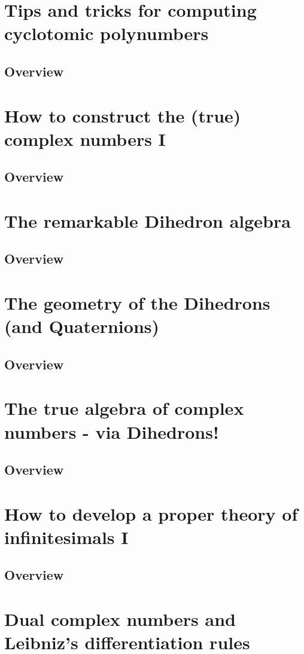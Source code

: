 \documentclass{article}
\begin{document}
\section{Tips and tricks for computing cyclotomic polynumbers}
\subsection{Overview}%
\label{sub:Overview}
\section{How to construct the (true) complex numbers I}
\subsection{Overview}%
\label{sub:Overview}
\section{The remarkable Dihedron algebra}
\subsection{Overview}%
\label{sub:Overview}
\section{The geometry of the Dihedrons (and Quaternions)}
\subsection{Overview}%
\label{sub:Overview}
\section{The true algebra of complex numbers - via Dihedrons!}
\subsection{Overview}%
\label{sub:Overview}
\section{How to develop a proper theory of infinitesimals I}
\subsection{Overview}%
\label{sub:Overview}
\section{Dual complex numbers and Leibniz's differentiation rules}
\end{document}
